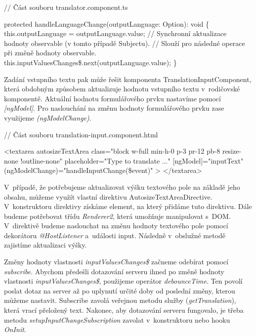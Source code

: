 \begin{prog}
// Část souboru translator.component.ts

protected handleLanguageChange(outputLanguage: Option): void \{
  this.outputLanguage = outputLanguage.value;
  // Synchronní aktualizace hodnoty observable (v tomto případě Subjectu).
  // Slouží pro následné operace při změně hodnoty observable.
  this.inputValuesChanges\$.next(outputLanguage.value);
\}
\end{prog}

Zadání vstupního textu pak může řešit komponenta TranslationInputComponent, která obdobným způsobem aktualizuje hodnotu vstupního textu v~rodičovské komponentě. 
Aktuální hodnotu formulářového prvku nastavíme pomocí \emph{[ngModel]}. Pro naslouchání na změnu hodnoty formulářového prvku zase využijeme \emph{(ngModelChange)}.

\begin{prog}
// Část souboru translation-input.component.html

<textarea
  autosizeTextArea
  class="block w-full min-h-0 p-3 pr-12 pb-8 resize-none !outline-none"
  placeholder="Type to translate ..."
  [ngModel]="inputText"
  (ngModelChange)="handleInputChange(\$event)"
>
</textarea>
\end{prog}

V~případě, že potřebujeme aktualizovat výšku textového pole na základě jeho obsahu, můžeme využít vlastní direktivu AutosizeTextAreaDirective. 
V~konstruktoru direktivy získáme element, na který přidáme tuto direktivu. Dále budeme potřebovat třídu \emph{Renderer2}, která umožňuje manipulovat s~DOM. 
V~direktivě budeme naslouchat na změnu hodnoty textového pole pomocí dekorátoru \emph{@HostListener} a~události input. Následně v~obslužné metodě zajistíme aktualizaci výšky.

Změny hodnoty vlastnosti \emph{inputValuesChanges\$} začneme odebírat pomocí \emph{subscribe}. 
Abychom předešli dotazování serveru ihned po změně hodnoty vlastnosti \emph{inputValuesChanges\$}, použijeme operátor \emph{debounceTime}. 
Ten povolí poslat dotaz na server až po uplynutí určité doby od poslední změny, kterou můžeme nastavit. 
Subscribe zavolá veřejnou metodu služby (\emph{getTranslation}), která vrací přeložený text. 
Nakonec, aby dotazování serveru fungovalo, je třeba metodu \emph{setupInputChangeSubscription} zavolat v~konstruktoru nebo hooku \emph{OnInit}.

